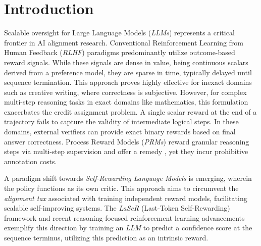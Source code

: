\documentclass[a4paper,oneside,10pt,ngerman,english]{scrartcl}
\begin{document}
\maketitle


\cleardoubleoddpage
\tableofcontents


\cleardoubleoddpage

\section{Introduction}
\label{sec:introduction}

Scalable oversight for Large Language Models (\textit{LLMs}) represents a critical frontier in AI alignment research. Conventional Reinforcement Learning from Human Feedback (\textit{RLHF}) \citep{rlhf} paradigms predominantly utilize outcome-based reward signals. While these signals are dense in value, being continuous scalars derived from a preference model, they are sparse in time, typically delayed until sequence termination. This approach proves highly effective for inexact domains such as creative writing, where correctness is subjective. However, for complex multi-step reasoning tasks in exact domains like mathematics, this formulation exacerbates the credit assignment problem. A single scalar reward at the end of a trajectory fails to capture the validity of intermediate logical steps. In these domains, external verifiers can provide exact binary rewards based on final answer correctness. Process Reward Models (\textit{PRMs}) reward granular reasoning steps via multi-step supervision and offer a remedy \citep{verifystepbystep}, yet they incur prohibitive annotation costs.

A paradigm shift towards \textit{Self-Rewarding Language Models} is emerging, wherein the policy functions as its own critic. This approach aims to circumvent the \textit{alignment tax} associated with training independent reward models, facilitating scalable self-improving systems. The \textit{LaSeR} (Last-Token Self-Rewarding) framework \citep{laser} and recent reasoning-focused reinforcement learning advancements \citep{r1} exemplify this direction by training an \textit{LLM} to predict a confidence score at the sequence terminus, utilizing this prediction as an intrinsic reward.
\end{document}
